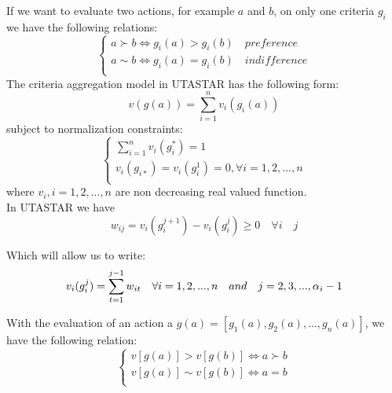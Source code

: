 \documentclass{report}
\begin{document}
If we want to evaluate two actions, for example $a$ and $b$, on only one criteria $g_i$ we have the following relations: 
\begin{equation}
      \begin{cases}
      	a \succ b\Leftrightarrow g_i(a) > g_i(b) \quad preference\\
      	a\sim b \Leftrightarrow g_i(a) = g_i(b) \quad indifference \\
      \end{cases}
\end{equation}
The criteria aggregation model in UTASTAR has the following form:
\begin{equation}\label{eq1}
      v(g(a)) = \sum_{i=1}^{n} v_i (g_i (a))
\end{equation}
subject to normalization constraints:\\
\begin{equation}\label{eq2}
      \begin{cases}
      	\sum_{i=1}^{n} v_i(g_{i}^{*}) = 1\\
       	v_i(g_{i*})= v_i(g_i^1)  = 0,  \forall i = 1, 2, ..., n\\
      \end{cases}
\end{equation}
where $ v_i, i = 1,2,...,n$ are non decreasing real valued function.\\

In UTASTAR we have 
\begin{equation}
	w_{ij} = v_i(g_i^{j+1}) - v_i(g_i^{j}) \geq 0 \quad \forall i \quad j 
\end{equation}

Which will allow us to write: 
\begin{equation}
	v_i(g_i^j) =	  \sum_{t=1}^{j-1} w_{it} \quad \forall i = 1,2,...,n \quad and \quad j = 2,3,...,\alpha _i -1 \\
\end{equation}

With the evaluation of an action a $g(a) = [g_1(a) ,  g_2(a) , ... , g_n(a)] $, we have the following relation:
\begin{equation}
      \begin{cases}
      	v[g(a)] > v[g(b)] \Leftrightarrow a \succ b\\
      	v[g(a)] \sim v[g(b)] \Leftrightarrow a = b\\
      \end{cases}
\end{equation}
\end{document}
